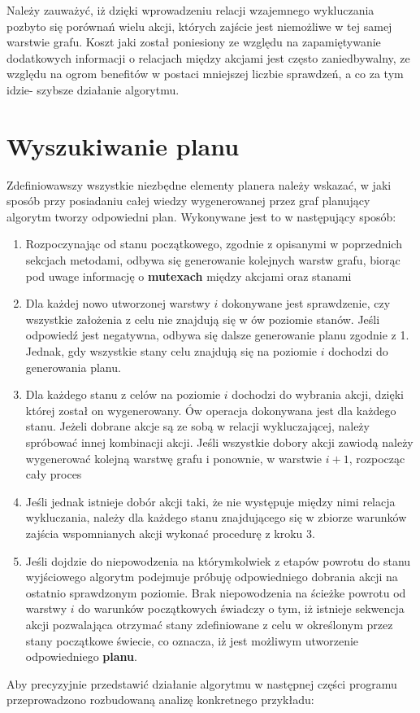     Należy zauważyć, iż dzięki wprowadzeniu relacji wzajemnego wykluczania pozbyto się porównań wielu akcji, których zajście jest niemożliwe w tej samej 
    warstwie grafu. Koszt jaki został poniesiony ze względu na zapamiętywanie dodatkowych informacji o relacjach między akcjami jest często zaniedbywalny,
    ze względu na ogrom benefitów w postaci mniejszej liczbie sprawdzeń, a co za tym idzie- szybsze działanie algorytmu.


\section{Wyszukiwanie planu}
    Zdefiniowawszy wszystkie niezbędne elementy planera należy wskazać, w jaki sposób przy posiadaniu całej wiedzy wygenerowanej przez graf planujący
    algorytm tworzy odpowiedni plan.
    Wykonywane jest to w następujący sposób:
    \begin{enumerate}
        \item Rozpoczynając od stanu początkowego, zgodnie z opisanymi w poprzednich sekcjach metodami, odbywa się generowanie kolejnych warstw grafu,
        biorąc pod uwage informację o \textbf{mutexach} między akcjami oraz stanami
        \item Dla każdej nowo utworzonej warstwy $i$ dokonywane jest sprawdzenie, czy wszystkie założenia z celu nie znajdują się 
        w ów poziomie stanów. Jeśli odpowiedź jest negatywna, odbywa się dalsze generowanie planu zgodnie z 1. Jednak, gdy 
        wszystkie stany celu znajdują się na poziomie $i$ dochodzi do generowania planu.
        \item Dla każdego stanu z celów na poziomie $i$ dochodzi do wybrania akcji, dzięki której został on wygenerowany. 
        Ów operacja dokonywana jest dla każdego stanu. Jeżeli dobrane akcje są ze sobą w relacji wykluczającej, należy spróbować innej 
        kombinacji akcji. Jeśli wszystkie dobory akcji zawiodą należy wygenerować kolejną warstwę grafu i ponownie, w warstwie $i+1$, rozpocząc cały proces
        \item Jeśli jednak istnieje dobór akcji taki, że nie występuje między nimi relacja wykluczania, należy dla każdego stanu 
        znajdującego się w zbiorze warunków zajścia wspomnianych akcji wykonać procedurę z kroku 3. 
        \item Jeśli dojdzie do niepowodzenia na którymkolwiek z etapów powrotu do stanu wyjściowego algorytm podejmuje próbuję odpowiedniego dobrania 
        akcji na ostatnio sprawdzonym poziomie. Brak niepowodzenia na ścieżke powrotu od warstwy $i$ do warunków początkowych świadczy o tym, 
        iż istnieje sekwencja akcji pozwalająca otrzymać stany zdefiniowane z celu w określonym przez stany początkowe świecie, co oznacza, 
        iż jest możliwym utworzenie odpowiedniego \textbf{planu}.
    \end{enumerate}
    Aby precyzyjnie przedstawić działanie algorytmu w następnej części programu przeprowadzono rozbudowaną analizę konkretnego przykładu:

